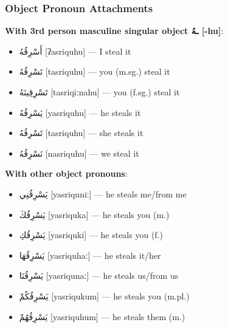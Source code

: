 \documentclass[letterpaper,12pt]{article}
\begin{document}
\subsubsection*{Object Pronoun Attachments}
\textbf{With 3rd person masculine singular object \textarabic{ـهُ} [-hu]}:
\begin{itemize}
  \item \textarabic{أَسْرِقُهُ} [ʔasriquhu] — I steal it
  \item \textarabic{تَسْرِقُهُ} [tasriquhu] — you (m.sg.) steal it
  \item \textarabic{تَسْرِقِينَهُ} [tasriqiːnahu] — you (f.sg.) steal it
  \item \textarabic{يَسْرِقُهُ} [yasriquhu] — he steals it
  \item \textarabic{تَسْرِقُهُ} [tasriquhu] — she steals it
  \item \textarabic{نَسْرِقُهُ} [nasriquhu] — we steal it
\end{itemize}

\textbf{With other object pronouns}:
\begin{itemize}
  \item \textarabic{يَسْرِقُنِي} [yasriquniː] — he steals me/from me
  \item \textarabic{يَسْرِقُكَ} [yasriquka] — he steals you (m.)
  \item \textarabic{يَسْرِقُكِ} [yasriquki] — he steals you (f.)
  \item \textarabic{يَسْرِقُهَا} [yasriquhaː] — he steals it/her
  \item \textarabic{يَسْرِقُنَا} [yasriqunaː] — he steals us/from us
  \item \textarabic{يَسْرِقُكُمْ} [yasriqukum] — he steals you (m.pl.)
  \item \textarabic{يَسْرِقُهُمْ} [yasriquhum] — he steals them (m.)
\end{itemize}
\end{document}

